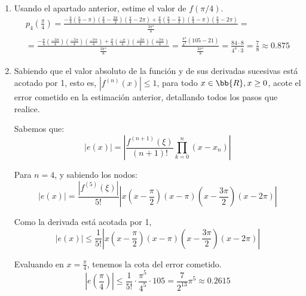 \begin{ejercicio}
\begin{enumerate}
        \item Usando el apartado anterior, estime el valor de $f(\pi/4)$.
        \begin{multline*}
            p_4\left(\frac{\pi}{4}\right) = \frac{-\frac{\pi}{4}(\frac{\pi}{4}-\pi)(\frac{\pi}{4}-\frac{3\pi}{2}) (\frac{\pi}{4}-2\pi)+\frac{\pi}{4}(\frac{\pi}{4}-\frac{\pi}{2})(\frac{\pi}{4}-\pi) (\frac{\pi}{4}-2\pi)}{\frac{3\pi^4}{8}}
            =\\=
             \frac{-\frac{\pi}{4}(\frac{-3\pi}{4})(\frac{-5\pi}{4}) (\frac{-7\pi}{4})+\frac{\pi}{4}(\frac{-\pi}{4})(\frac{-3\pi}{4}) (\frac{-7\pi}{4})}{\frac{3\pi^4}{8}}
             = \frac{\frac{\pi^4}{4^4}(105-21)}{\frac{3\pi^4}{8}} = \frac{84\cdot 8}{4^4 \cdot 3} = \frac{7}{8}\approx 0.875 
        \end{multline*}


        
        \item Sabiendo que el valor absoluto de la función y de sus derivadas sucesivas está acotado por 1, esto es, $|f^{(n)}(x)| \leq 1$, para todo $x\in \bb{R},x\geq 0$, acote el error cometido en la estimación anterior, detallando todos los pasos que realice.

        Sabemos que:
        \begin{equation*}
            |e(x)| = \left|\frac{f^{(n+1)}(\xi)}{(n+1)!}\prod_{k=0}^n(x-x_n) \right|
        \end{equation*}

        Para $n=4$, y sabiendo los nodos:
        \begin{equation*}
            |e(x)| = \frac{|f^{(5)}(\xi)|}{5!}\left|x\left(x-\frac{\pi}{2}\right)(x-\pi)\left(x-\frac{3\pi}{2}\right)(x-2\pi) \right|
        \end{equation*}

        Como la derivada está acotada por 1,
        \begin{equation*}
            |e(x)| \leq \frac{1}{5!}\left|x\left(x-\frac{\pi}{2}\right)(x-\pi)\left(x-\frac{3\pi}{2}\right)(x-2\pi) \right|
        \end{equation*}

        Evaluando en $x=\frac{\pi}{4}$, tenemos la cota del error cometido.
        \begin{equation*}
            \left|e\left(\frac{\pi}{4}\right)\right| \leq \frac{1}{5!}\cdot \frac{\pi^5}{4^5}\cdot 105 = \frac{7}{2^{13}}\pi ^5 \approx 0.2615
        \end{equation*}
    \end{enumerate}
\end{ejercicio}

